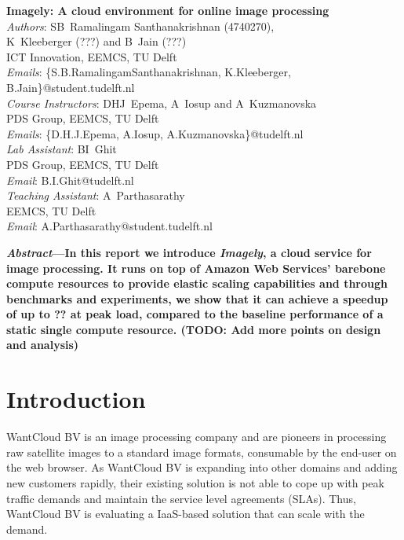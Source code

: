 \documentclass[a4paper]{IEEEtran}
\begin{document}
\setlength{\tabcolsep}{16pt}
\renewcommand{\arraystretch}{1.25}

\begin{center}
  \textbf{\Large{
    Imagely: A cloud environment for online image processing
  }}\\
  \vspace{0.25cm}
  \emph{Authors}: SB~Ramalingam Santhanakrishnan (4740270), \\ K~Kleeberger (???) and B~Jain (???)\\
  ICT Innovation, EEMCS, TU Delft\\
  \emph{Emails}: \{S.B.RamalingamSanthanakrishnan, K.Kleeberger, B.Jain\}@student.tudelft.nl\\
  \vspace{0.2cm}
  \emph{Course Instructors}: DHJ~Epema, A~Iosup and A~Kuzmanovska\\
  PDS Group, EEMCS, TU Delft\\
  \emph{Emails}: \{D.H.J.Epema, A.Iosup, A.Kuzmanovska\}@tudelft.nl\\
  \vspace{0.2cm}
  \emph{Lab Assistant}: BI~Ghit\\
  PDS Group, EEMCS, TU Delft\\
  \emph{Email}: B.I.Ghit@tudelft.nl\\
  \vspace{0.2cm}
  \emph{Teaching Assistant}: A~Parthasarathy\\
  EEMCS, TU Delft\\
  \emph{Email}: A.Parthasarathy@student.tudelft.nl\\
\end{center}

\vspace{0.2cm}

\textbf{
  \emph{Abstract}---In this report we introduce \emph{Imagely}, a cloud service for image processing. It runs on top of Amazon Web Services' barebone compute resources to provide elastic scaling capabilities and through benchmarks and experiments, we show that it can achieve a speedup of up to ?? at peak load, compared to the baseline performance of a static single compute resource. (TODO: Add more points on design and analysis)
}

\section{Introduction}

WantCloud BV is an image processing company and are pioneers in processing raw satellite images to a standard image formats, consumable by the end-user on the web browser. As WantCloud BV is expanding into other domains and 
adding new customers rapidly, their existing solution is not able to cope up with peak traffic demands and
 maintain the service level agreements (SLAs). Thus, WantCloud BV is evaluating a IaaS-based solution that
  can scale with the demand.
\end{document}
